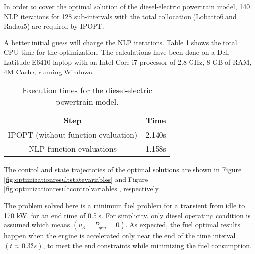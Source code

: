 In order to cover the optimal solution of the diesel-electric
powertrain model, 140 NLP iterations for 128 sub-intervals
with the total collocation (Lobatto6 and Radau5) are required by
IPOPT.

A better initial guess will change the NLP iterations.
Table \ref{tab:table1} shows the total CPU time for the optimization. The calculations have been done on a Dell Latitude E6410 laptop
with an Intel Core i7 processor of 2.8 GHz, 8 GB of RAM, 4M Cache, running Windows.

\begin{table} [!h]
\begin{center}
	\caption{Execution times for the diesel-electric powertrain model.} 
	\label{tab:table1} 
	\begin{tabular}{ cc } 
		\hline
		\bfseries Step & \bfseries Time  \\ 
		IPOPT (without function evaluation) & 2.140s \\ 
		NLP function evaluations & 1.158s \\ 
		\hline
	\end{tabular}
\end{center}
\end{table}

The control and state trajectories of the optimal solutions are shown in Figure \ref{fig:optimizationresultstatevariables} and Figure \ref{fig:optimizationresultcontrolvariables}, respectively. 



The problem solved here is a minimum fuel problem for a transient from idle to 170 kW, for an end time of 0.5 s. For simplicity, only diesel operating condition is assumed which
means $(u_3=P_{gen} = 0)$. As expected, the fuel optimal results happen when the engine is accelerated only near the
end of the time interval $(t\approx 0.32 s)$, to meet the end constraints while minimizing the fuel consumption.

